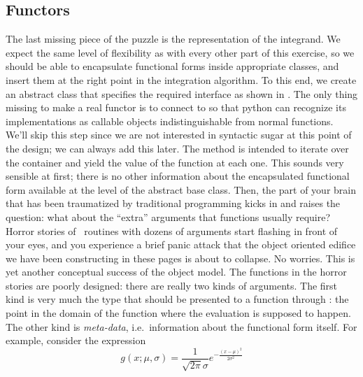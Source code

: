 \subsection{Functors}
\label{sec:classes:functors}

The last missing piece of the puzzle is the representation of the integrand. We expect the same
level of flexibility as with every other part of this exercise, so we should be able to
encapsulate functional forms inside appropriate classes, and insert them at the right point in
the integration algorithm. To this end, we create an abstract class  that
specifies the required interface as shown in . The only thing
missing to make  a real functor\supercite{c++-idioms} is to connect
 to  so that python can recognize its implementations as
callable objects indistinguishable from normal functions. We'll skip this step since we are not
interested in syntactic sugar at this point of the design; we can always add this later.
%
%
The method  is intended to iterate over the container  and
yield the value of the function at each one. This sounds very sensible at first; there is no
other information about the encapsulated functional form available at the level of the
abstract base class. Then, the part of your brain that has been traumatized by traditional
programming kicks in and raises the question: what about the ``extra'' arguments that functions
usually require? Horror stories of \fortran\ routines with dozens of arguments start flashing
in front of your eyes, and you experience a brief panic attack that the object oriented
edifice we have been constructing in these pages is about to collapse. No worries. This is yet
another conceptual success of the object model. The functions in the horror stories are poorly
designed: there are really two kinds of arguments. The first kind is very much the type that
should be presented to a function through : the point in the domain of the
function where the evaluation is supposed to happen. The other kind is {\em meta-data},
i.e.~information about the functional form itself. For example, consider the expression
%
\begin{equation}
  g(x; \mu,\sigma) = \frac{1}{\sqrt{2\pi} \sigma} e^{-\frac{(x-\mu)^2}{2\sigma^2}}
\label{eq:gaussian}
\end{equation}
